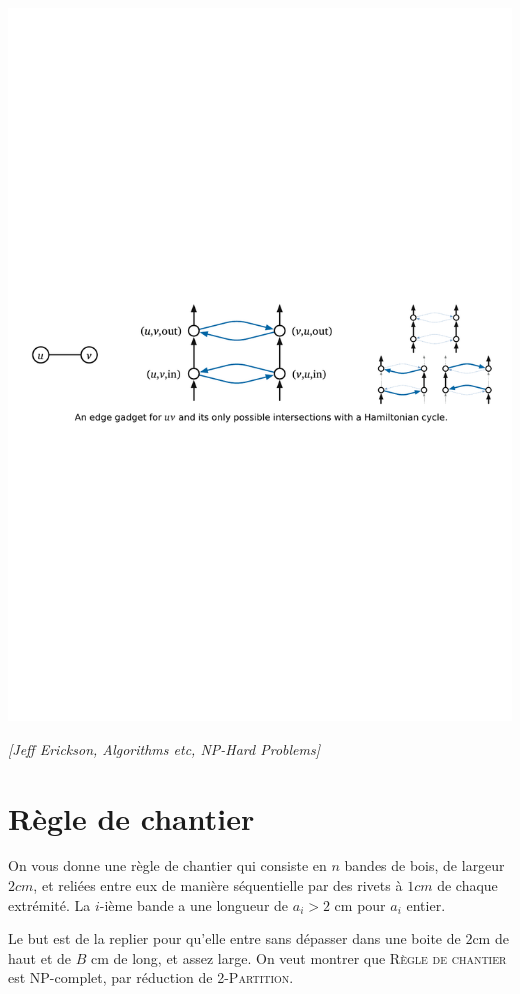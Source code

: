 \documentclass[12pt]{article}
\newcommand{\source}[1]{\begin{flushright}\emph{[#1]}\end{flushright}}
\begin{document}
\centerline{\includegraphics[width=15cm]{figures/hamiltonian.pdf}}
\source{Jeff Erickson, Algorithms etc, NP-Hard Problems}

\section{Règle de chantier}

On vous donne une règle de chantier qui consiste en $n$ bandes de bois, de largeur $2cm$, et reliées entre eux de manière séquentielle par des rivets à $1cm$ de chaque extrémité. La $i$-ième bande a une longueur de $a_i>2$ cm pour $a_i$ entier.

Le but est de la replier pour qu'elle entre sans dépasser dans une boite de $2$cm de haut et de $B$ cm de long, et assez large.
On veut montrer que \textsc{Règle de chantier} est NP-complet, par réduction de \textsc{2-Partition}.
\end{document}
